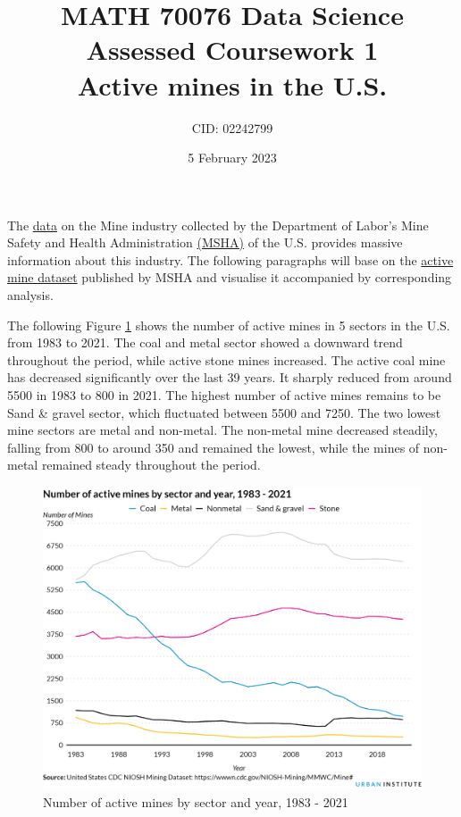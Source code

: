 \documentclass[11pt]{article}
\title{MATH  70076 Data Science \\ Assessed Coursework 1\\ Active mines in the U.S.}
\author{CID: 02242799}
\date{5 February 2023}
\begin{document}
\begin{CJK}{UTF8}{gbsn}
\maketitle

The \href{https://www.msha.gov/data-and-reports}{data} on the Mine industry collected by the Department of Labor's Mine Safety and Health Administration  \href{https://www.msha.gov/}{(MSHA)} of the U.S. provides massive information about this industry. The following paragraphs will base on the \href{https://wwwn.cdc.gov/niosh-mining/MMWC#disasters}{active mine dataset} published by MSHA and visualise it accompanied by corresponding analysis.

The following Figure \ref{fig:act1} shows the number of active mines in 5 sectors in the U.S. from 1983 to 2021. The coal and metal sector showed a downward trend throughout the period, while active stone mines increased. The active coal mine has decreased significantly over the last 39 years. It sharply reduced from around 5500 in 1983 to 800 in 2021. The highest number of active mines remains to be Sand \& gravel sector, which fluctuated between 5500 and 7250. The two lowest mine sectors are metal and non-metal. The non-metal mine decreased steadily, falling from 800 to around 350 and remained the lowest, while the mines of non-metal remained steady throughout the period.

\begin{figure}[h]
  \centering
  \includegraphics[width=12cm]{../outputs/opt_num_plot.png}
  \caption{Number of active mines by sector and year, 1983 - 2021}
  \label{fig:act1}
\end{figure}


\end{CJK}
\end{document}
